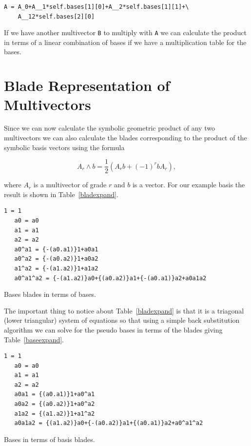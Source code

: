 \documentclass[12pt]{report}
\newcommand{\lp}{\left (}
\newcommand{\rp}{\right )}
\newcommand{\half}{\frac{1}{2}}
\newcommand{\W}{\wedge}
\newcommand{\T}[1]{\texttt{#1}}
\begin{document}
\begin{lstlisting}[numbers=none]
A = A_0+A__1*self.bases[1][0]+A__2*self.bases[1][1]+\
    A__12*self.bases[2][0]
\end{lstlisting}

If we have another multivector \T{B} to multiply with \T{A} we can calculate the product in
terms of a linear combination of bases if we have a multiplication table for the bases.

\section{Blade Representation of Multivectors}

Since we can now calculate the symbolic geometric product of any two
multivectors we can also calculate the blades corresponding to the product of
the symbolic basis vectors using the formula

  \begin{equation}
    A_{r}\W b = \half\lp A_{r}b+\lp -1 \rp^{r}bA_{r} \rp,
  \end{equation}

where $A_{r}$ is a multivector of grade $r$ and $b$ is a
vector.  For our example basis the result is shown in Table~\ref{bladexpand}.

\begin{table}[h]
\begin{lstlisting}[numbers=none]
   1 = 1
   a0 = a0
   a1 = a1
   a2 = a2
   a0^a1 = {-(a0.a1)}1+a0a1
   a0^a2 = {-(a0.a2)}1+a0a2
   a1^a2 = {-(a1.a2)}1+a1a2
   a0^a1^a2 = {-(a1.a2)}a0+{(a0.a2)}a1+{-(a0.a1)}a2+a0a1a2
\end{lstlisting}
\caption{Bases blades in terms of bases.}\label{bladexpand}
\end{table}

The important thing to notice about Table~\ref{bladexpand} is that it is a
triagonal (lower triangular) system of equations so that using a simple back
substitution algorithm we can solve for the pseudo bases in terms of the blades
giving Table~\ref{baseexpand}.

\begin{table}
\begin{lstlisting}[numbers=none]
   1 = 1
   a0 = a0
   a1 = a1
   a2 = a2
   a0a1 = {(a0.a1)}1+a0^a1
   a0a2 = {(a0.a2)}1+a0^a2
   a1a2 = {(a1.a2)}1+a1^a2
   a0a1a2 = {(a1.a2)}a0+{-(a0.a2)}a1+{(a0.a1)}a2+a0^a1^a2
\end{lstlisting}
\caption{Bases in terms of basis blades.}\label{baseexpand}
\end{table}
\end{document}
